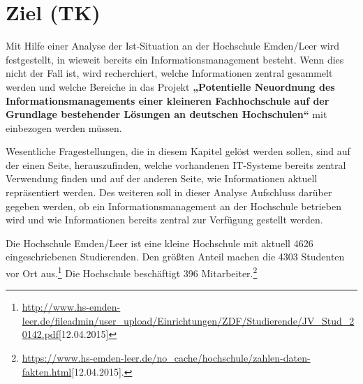\section{Ziel (TK)}
Mit Hilfe einer Analyse der Ist-Situation an der Hochschule Emden/Leer wird festgestellt, in wieweit bereits ein Informationsmanagement besteht. Wenn dies nicht der Fall ist, wird recherchiert, welche Informationen zentral gesammelt werden und welche Bereiche in das Projekt \textbf{„Potentielle Neuordnung des Informationsmanagements einer kleineren Fachhochschule auf der Grundlage bestehender Lösungen an deutschen Hochschulen“} mit einbezogen werden müssen.

Wesentliche Fragestellungen, die in diesem Kapitel gelöst werden sollen, sind auf der einen Seite, herauszufinden, welche vorhandenen IT-Systeme bereits zentral Verwendung finden und auf der anderen Seite, wie Informationen aktuell repräsentiert werden. Des weiteren soll in dieser Analyse Aufschluss darüber gegeben werden, ob ein Informationsmanagement an der Hochschule betrieben wird und wie Informationen bereits zentral zur Verfügung gestellt werden.

Die Hochschule Emden/Leer ist eine kleine Hochschule mit aktuell 4626 eingeschriebenen Studierenden. Den größten Anteil machen die 4303 Studenten vor Ort aus.\footnote{\url{http://www.hs-emden-leer.de/fileadmin/user_upload/Einrichtungen/ZDF/Studierende/JV_Stud_20142.pdf}[12.04.2015]} Die Hochschule beschäftigt 396 Mitarbeiter.\footnote{\url{https://www.hs-emden-leer.de/no_cache/hochschule/zahlen-daten-fakten.html}[12.04.2015].}